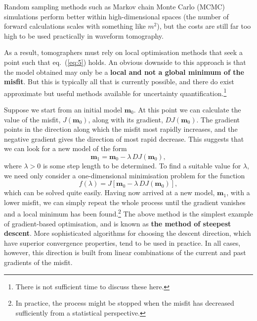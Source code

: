 Random sampling methods such as Markov chain Monte Carlo (MCMC) simulations perform better within high-dimensional spaces 
(the number of forward calculations scales with something like $m^{2}$), but the costs are still far too high to be used 
practically in waveform tomography. 

As a result, tomographers must rely on local optimisation methods that seek a point such that eq.~(\ref{eq:5}) holds. 
An obvious downside to this approach is that the model obtained may only be a \textbf{local and not a global minimum of 
the misfit}. But this is typically all that is currently possible, and there do exist approximate but useful methods available 
for uncertainty quantification.\footnote{There is not sufficient time to discuss these here.}

Suppose we start from an initial model $\mathbf{m}_{0}$. At this point we can calculate the value of the misfit,
 $J(\mathbf{m}_{0})$, along with its gradient, $DJ(\mathbf{m}_{0})$. The gradient points in the direction along which 
 the misfit most rapidly increases, and the negative gradient gives the direction of most rapid decrease. This suggests
  that we can look for a new model of the form
\begin{equation}
\mathbf{m}_{1}=\mathbf{m}_{0}-\lambda\,DJ(\mathbf{m}_{0}),
\label{eq:6}
\end{equation}
where $\lambda>0$ is some step length to be determined. To find a suitable value for $\lambda$, we need only consider 
a one-dimensional minimisation problem for the function
\begin{equation}
f(\lambda)=J[\mathbf{m}_{0}-\lambda\,DJ(\mathbf{m}_{0})],
\label{eq:7}
\end{equation}
which can be solved quite easily. Having now arrived at a new model, $\mathbf{m}_{1}$, with a lower 
misfit, we can simply repeat the whole process until the gradient vanishes and a local minimum has been 
found.\footnote{In practice, the process might be stopped when the misfit has decreased sufficiently from a
 statistical perspective.} The above method is the simplest example of gradient-based optimisation, and is known as
\textbf{the method of steepest descent}. More sophisticated algorithms for choosing the descent direction, 
which have superior convergence properties, tend to be used in practice. In all cases, however, this direction 
is built from linear combinations of the current and past gradients of the misfit.

